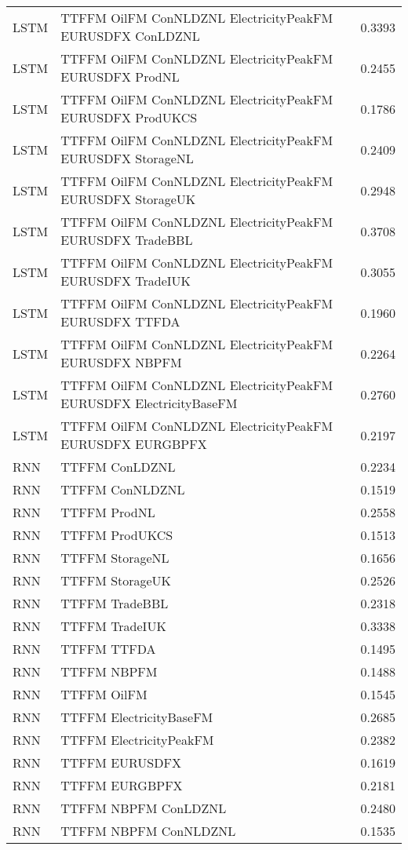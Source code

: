 \begin{table}[h!]
\begin{adjustbox}{max width=\textwidth}
\begin{tabular}{llr}
  LSTM & TTFFM OilFM ConNLDZNL ElectricityPeakFM EURUSDFX ConLDZNL & 0.3393 \\ 
  LSTM & TTFFM OilFM ConNLDZNL ElectricityPeakFM EURUSDFX ProdNL & 0.2455 \\ 
  LSTM & TTFFM OilFM ConNLDZNL ElectricityPeakFM EURUSDFX ProdUKCS & 0.1786 \\ 
  LSTM & TTFFM OilFM ConNLDZNL ElectricityPeakFM EURUSDFX StorageNL & 0.2409 \\ 
  LSTM & TTFFM OilFM ConNLDZNL ElectricityPeakFM EURUSDFX StorageUK & 0.2948 \\ 
  LSTM & TTFFM OilFM ConNLDZNL ElectricityPeakFM EURUSDFX TradeBBL & 0.3708 \\ 
  LSTM & TTFFM OilFM ConNLDZNL ElectricityPeakFM EURUSDFX TradeIUK & 0.3055 \\ 
  LSTM & TTFFM OilFM ConNLDZNL ElectricityPeakFM EURUSDFX TTFDA & 0.1960 \\ 
  LSTM & TTFFM OilFM ConNLDZNL ElectricityPeakFM EURUSDFX NBPFM & 0.2264 \\ 
  LSTM & TTFFM OilFM ConNLDZNL ElectricityPeakFM EURUSDFX ElectricityBaseFM & 0.2760 \\ 
  LSTM & TTFFM OilFM ConNLDZNL ElectricityPeakFM EURUSDFX EURGBPFX & 0.2197 \\ 
  RNN & TTFFM ConLDZNL & 0.2234 \\ 
  RNN & TTFFM ConNLDZNL & 0.1519 \\ 
  RNN & TTFFM ProdNL & 0.2558 \\ 
  RNN & TTFFM ProdUKCS & 0.1513 \\ 
  RNN & TTFFM StorageNL & 0.1656 \\ 
  RNN & TTFFM StorageUK & 0.2526 \\ 
  RNN & TTFFM TradeBBL & 0.2318 \\ 
  RNN & TTFFM TradeIUK & 0.3338 \\ 
  RNN & TTFFM TTFDA & 0.1495 \\ 
  RNN & TTFFM NBPFM & 0.1488 \\ 
  RNN & TTFFM OilFM & 0.1545 \\ 
  RNN & TTFFM ElectricityBaseFM & 0.2685 \\ 
  RNN & TTFFM ElectricityPeakFM & 0.2382 \\ 
  RNN & TTFFM EURUSDFX & 0.1619 \\ 
  RNN & TTFFM EURGBPFX & 0.2181 \\ 
  RNN & TTFFM NBPFM ConLDZNL & 0.2480 \\ 
  RNN & TTFFM NBPFM ConNLDZNL & 0.1535 \\ 

\end{tabular}
\end{adjustbox}
\end{table}
